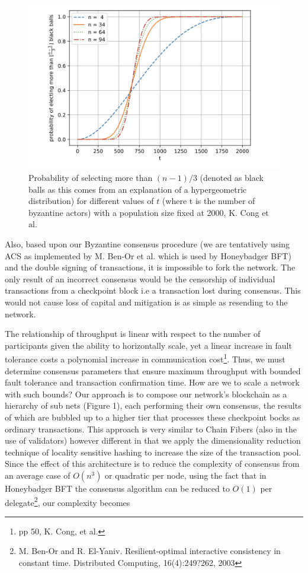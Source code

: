 \documentclass{article}
\begin{document}
\begin{figure}[H]
\centering
\includegraphics[scale=0.35]{fault-threshold-vs-byz-delegates.PNG}
\caption{Probability of selecting more than $(n-1)/3$ (denoted as black balls as this comes from an explanation of a hypergeometric distribution) for different values of $t$ (where t is the number of byzantine actors) with a population size fixed at 2000, K. Cong et al.}
\end{figure} 

Also, based upon our Byzantine consensus procedure (we are tentatively using ACS as implemented by M. Ben-Or et al. which is used by Honeybadger BFT) and the double signing of transactions, it is impossible to fork the network. The only result of an incorrect consensus would be the censorship of individual transactions from a checkpoint block i.e a transaction lost during consensus. This would not cause loss of capital and mitigation is as simple as resending to the network.

The relationship of throughput is linear with respect to the number of participants given the ability to horizontally scale, yet a linear increase in fault tolerance costs a polynomial increase in communication cost\footnote{pp 50, K. Cong, et al.}. Thus, we must determine consensus parameters that ensure maximum throughput with bounded fault tolerance and transaction confirmation time. How are we to scale a network with such bounds? Our approach is to compose our network's blockchain as a hierarchy of sub nets (Figure 1), each performing their own consensus, the results of which are bubbled up to a higher tier that processes these checkpoint bocks as ordinary transactions. This approach is very similar to Chain Fibers (also in the use of validators) however different in that we apply the dimensionality reduction technique of locality sensitive hashing to increase the size of the transaction pool. Since the effect of this architecture is to reduce the complexity of consensus from an average case  of $O(n^3)$ or quadratic per node, using the fact that in Honeybadger BFT the consensus algorithm can be reduced to $O(1)$ per delegate\footnote{M. Ben-Or and R. El-Yaniv. Resilient-optimal interactive consistency in constant time. Distributed Computing, 16(4):249?262, 2003}, our complexity becomes
\end{document}
